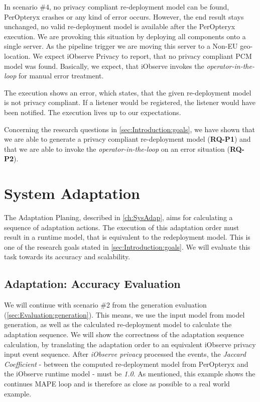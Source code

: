 In scenario \#4, no privacy compliant re-deployment model can be found, PerOpteryx crashes or any kind of error occurs. However, the end result stays unchanged, no valid re-deployment model is available after the PerOpteryx execution. We are provoking this situation by deploying all components onto a single server. As the pipeline trigger we are moving this server to a Non-EU geo-location. We expect iObserve Privacy to report, that no privacy compliant PCM model was found. Basically, we expect, that iObserve invokes the \textit{operator-in-the-loop} for manual error treatment.

The execution shows an error, which states, that the given re-deployment model is not privacy compliant. If a listener would be registered, the listener would have been notified. The execution lives up to our expectations.

Concerning the research questions in \autoref{sec:Introduction:goals}, we have shown that we are able to generate a privacy compliant re-deployment model (\textbf{RQ-P1}) and that we are able to invoke the \textit{operator-in-the-loop} on an error situation (\textbf{RQ-P2}).

\section{System Adaptation}
\label{sec:Evaluation:planning}

The Adaptation Planing, described in \autoref{ch:SysAdap}, aims for calculating a sequence of adaptation actions. The execution of this adaptation order must result in a runtime model, that is equivalent to the redeployment model. This is one of the research goals stated in \autoref{sec:Introduction:goals}. We will evaluate this task towards its accuracy and scalability.

 
\subsection{Adaptation: Accuracy Evaluation}

We will continue with scenario \#2 from the generation evaluation (\autoref{sec:Evaluation:generation}). This means, we use the input model from model generation, as well as the calculated re-deployment model to calculate the adaptation sequence. We will show the correctness of the adaptation sequence calculation, by translating the adaptation order to an equivalent iObserve privacy input event sequence. After \textit{iObserve privacy} processed the events, the \textit{Jaccard Coefficient} - between the computed re-deployment model from PerOpteryx and the iObserve runtime model - must be \textit{1.0}. As mentioned, this example shows the continues MAPE loop and is therefore as close as possible to a real world example.

